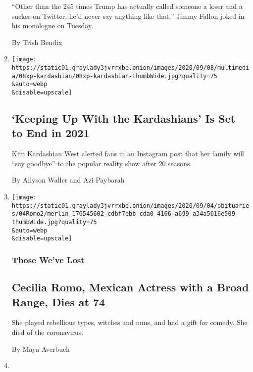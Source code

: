 \begin{enumerate}
  ``Other than the 245 times Trump has actually called someone a loser
  and a sucker on Twitter, he'd never say anything like that,'' Jimmy
  Fallon joked in his monologue on Tuesday.

  By Trish Bendix
\item
  \href{/2020/09/08/arts/television/kim-kardashian-keeping-up-with-the-kardashians.html}{}

  \texttt{[image: https://static01.graylady3jvrrxbe.onion/images/2020/09/08/multimedia/08xp-kardashian/08xp-kardashian-thumbWide.jpg?quality=75\\\&auto=webp\\\&disable=upscale]}

  \hypertarget{keeping-up-with-the-kardashians-is-set-to-end-in-2021}{%
  \subsection{`Keeping Up With the Kardashians' Is Set to End in
  2021}\label{keeping-up-with-the-kardashians-is-set-to-end-in-2021}}

  Kim Kardashian West alerted fans in an Instagram post that her family
  will ``say goodbye'' to the popular reality show after 20 seasons.

  By Allyson Waller and Azi Paybarah
\item
  \href{/2020/09/08/obituaries/cecilia-romo-dead-coronavirus.html}{}

  \texttt{[image: https://static01.graylady3jvrrxbe.onion/images/2020/09/04/obituaries/04Romo2/merlin\_176545602\_cdbf7ebb-cda0-4166-a699-a34a5616e509-thumbWide.jpg?quality=75\\\&auto=webp\\\&disable=upscale]}

  \hypertarget{those-weve-lost}{%
  \subsubsection{Those We've Lost}\label{those-weve-lost}}

  \hypertarget{cecilia-romo-mexican-actress-with-a-broad-range-dies-at-74}{%
  \subsection{Cecilia Romo, Mexican Actress with a Broad Range, Dies at
  74}\label{cecilia-romo-mexican-actress-with-a-broad-range-dies-at-74}}

  She played rebellious types, witches and nuns, and had a gift for
  comedy. She died of the coronavirus.

  By Maya Averbuch
\item
  \href{/2020/09/08/arts/new-yorker-festival-chris-rock-elizabeth-warren.html}{}


\end{enumerate}
